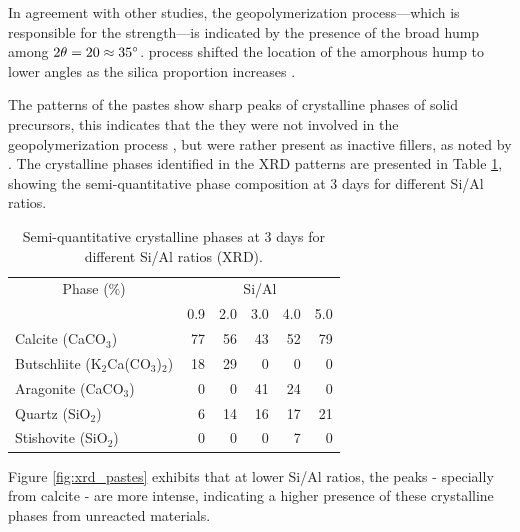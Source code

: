 In agreement with other studies, the geopolymerization process—which is responsible for the strength—is indicated by the presence of the broad hump among $2\theta = 20 \approx 35^{\circ}$.
process shifted the location of the amorphous hump to lower angles as the silica proportion increases \cite{arellano2014geopolymer,lee2017strength, wan2017geopolymerization}.

The patterns of the pastes show sharp peaks of crystalline phases of solid precursors, this indicates that the they were not involved in the geopolymerization process \cite{Geraldo2020}, but were rather present as inactive fillers, as noted by \cite{ruiz2012alkaline}.
The crystalline phases identified in the XRD patterns are presented in Table \ref{tab:xrd_phases_pastes}, showing the semi-quantitative phase composition at 3 days for different Si/Al ratios.

\begin{table}[H]
    \centering
    \caption{Semi-quantitative crystalline phases at 3 days for different Si/Al ratios (XRD).}
    \label{tab:xrd_phases_pastes}
    \begin{tabular}{lrrrrr}
        \hline
        \multicolumn{1}{c}{Phase (\%)} &
        \multicolumn{5}{c}{Si/Al}\\
        \cline{2-6}
        & 0.9 & 2.0 & 3.0 & 4.0 & 5.0 \\
        \hline
        Calcite (CaCO$_3$) & 77 & 56 & 43 & 52 & 79 \\
        Butschliite (K$_2$Ca(CO$_3$)$_2$) & 18 & 29 & 0 & 0 & 0 \\
        Aragonite (CaCO$_3$) & 0 & 0 & 41 & 24 & 0 \\
        Quartz (SiO$_2$) & 6 & 14 & 16 & 17 & 21 \\
        Stishovite (SiO$_2$) & 0 & 0 & 0 & 7 & 0 \\
        \hline
    \end{tabular}
\end{table}

Figure \ref{fig:xrd_pastes} exhibits that at lower Si/Al ratios, the peaks - specially from calcite - are more intense, indicating a higher presence of these crystalline phases from unreacted materials.


